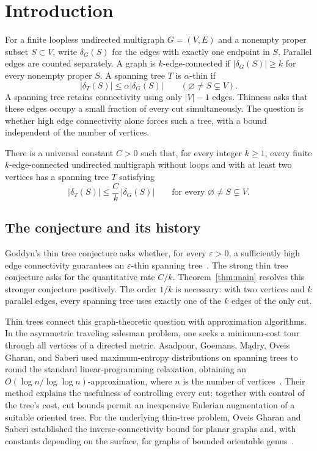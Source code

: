 \section{Introduction}\label{sec:introduction}

For a finite loopless undirected multigraph \(G=(V,E)\) and a nonempty proper
subset \(S\subset V\), write \(\delta_G(S)\) for the edges with exactly
one endpoint in \(S\). Parallel edges are counted separately.
A graph is \(k\)-edge-connected if \(|\delta_G(S)|\ge k\) for
every nonempty proper \(S\).
A spanning tree \(T\) is \(\alpha\)-thin if
\[
 |\delta_T(S)|\le\alpha|\delta_G(S)|
 \qquad(\varnothing\ne S\subsetneq V).
\]
A spanning tree retains connectivity using only \(|V|-1\) edges.
Thinness asks that these edges occupy a small fraction of every cut
simultaneously. The question is whether high edge connectivity alone
forces such a tree, with a bound independent of the number of vertices.

\begin{theorem}\label{thm:main}
There is a universal constant \(C>0\) such that, for every integer
\(k\ge1\), every finite \(k\)-edge-connected undirected multigraph
without loops and with at least two vertices has a spanning tree \(T\)
satisfying
\[
 |\delta_T(S)|\le\frac Ck\,|\delta_G(S)|
 \qquad\text{for every }\varnothing\ne S\subsetneq V.
\]
\end{theorem}

\subsection*{The conjecture and its history}

Goddyn's thin tree conjecture asks whether, for every
\(\varepsilon>0\), a sufficiently high edge connectivity guarantees
an \(\varepsilon\)-thin spanning tree~\cite{Goddyn}.
The strong thin tree conjecture asks for the quantitative rate \(C/k\).
Theorem~\ref{thm:main} resolves this stronger conjecture positively.
The order \(1/k\) is necessary: with two vertices and \(k\) parallel
edges, every spanning tree uses exactly one of the \(k\) edges of
the only cut.

Thin trees connect this graph-theoretic question with approximation
algorithms. In the asymmetric traveling salesman problem, one seeks a
minimum-cost tour through all vertices of a directed metric.
Asadpour, Goemans, M\k{a}dry, Oveis Gharan, and Saberi used
maximum-entropy distributions on spanning trees to round the standard
linear-programming relaxation, obtaining an
\(O(\log n/\log\log n)\)-approximation, where \(n\) is the number
of vertices~\cite{AsadpourSODA,Asadpour}.
Their method explains the usefulness of controlling every cut:
together with control of the tree's cost, cut bounds permit an inexpensive
Eulerian augmentation of a suitable oriented tree.
For the underlying thin-tree problem, Oveis Gharan and
Saberi established the inverse-connectivity bound for planar graphs
and, with constants depending on the surface, for graphs of bounded
orientable genus~\cite[Theorem~5.1]{OveisGharanSaberi2011}.

